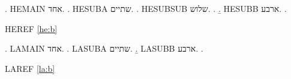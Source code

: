 

\ex. HEMAIN אחד.
\a. HESUBA שתיים.
\a. HESUBSUB שלוש.
\z.
\b. HESUBB ארבע.\label{he:b}
\z.

HEREF \ref{he:b}

\let\Exalph\ExLatinAlph
\ex. LAMAIN אחד.
\a. LASUBA שתיים.
\b. LASUBB ארבע.\label{la:b}
\z.

LAREF \ref{la:b}

